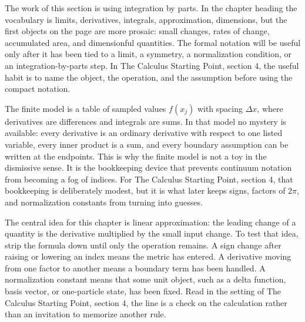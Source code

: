 











The work of this section is using integration by parts.  In the chapter heading the vocabulary is limits, derivatives, integrals, approximation, dimensions, but the first objects on the page are more prosaic: small changes, rates of change, accumulated area, and dimensionful quantities.  The formal notation will be useful only after it has been tied to a limit, a symmetry, a normalization condition, or an integration-by-parts step.  In The Calculus Starting Point, section 4, the useful habit is to name the object, the operation, and the assumption before using the compact notation.

The finite model is a table of sampled values \(f(x_j)\) with spacing \(\Delta x\), where derivatives are differences and integrals are sums.  In that model no mystery is available: every derivative is an ordinary derivative with respect to one listed variable, every inner product is a sum, and every boundary assumption can be written at the endpoints.  This is why the finite model is not a toy in the dismissive sense.  It is the bookkeeping device that prevents continuum notation from becoming a fog of indices.  For The Calculus Starting Point, section 4, that bookkeeping is deliberately modest, but it is what later keeps signs, factors of \(2\pi\), and normalization constants from turning into guesses.

The central idea for this chapter is linear approximation: the leading change of a quantity is the derivative multiplied by the small input change.  To test that idea, strip the formula down until only the operation remains.  A sign change after raising or lowering an index means the metric has entered.  A derivative moving from one factor to another means a boundary term has been handled.  A normalization constant means that some unit object, such as a delta function, basis vector, or one-particle state, has been fixed.  Read in the setting of The Calculus Starting Point, section 4, the line is a check on the calculation rather than an invitation to memorize another rule.

